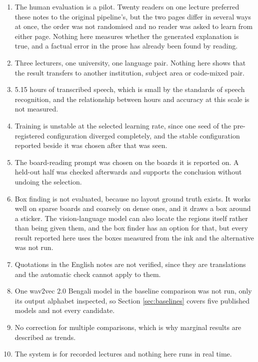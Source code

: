 \begin{enumerate}
  \item The human evaluation is a pilot. Twenty readers on one lecture preferred these
        notes to the original pipeline's, but the two pages differ in several ways at
        once, the order was not randomised and no reader was asked to learn from either
        page. Nothing here measures whether the generated explanation is true, and a
        factual error in the prose has already been found by reading.
  \item Three lecturers, one university, one language pair. Nothing here shows that the
        result transfers to another institution, subject area or code-mixed pair.
  \item 5.15 hours of transcribed speech, which is small by the standards of speech
        recognition, and the relationship between hours and accuracy at this scale is not
        measured.
  \item Training is unstable at the selected learning rate, since one seed of the
        pre-registered configuration diverged completely, and the stable configuration
        reported beside it was chosen after that was seen.
  \item The board-reading prompt was chosen on the boards it is reported on. A held-out
        half was checked afterwards and supports the conclusion without undoing the
        selection.
  \item Box finding is not evaluated, because no layout ground truth exists. It works well
        on sparse boards and coarsely on dense ones, and it draws a box around a sticker.
        The vision-language model can also locate the regions itself rather than being
        given them, and the box finder has an option for that, but every result reported
        here uses the boxes measured from the ink and the alternative was not run.
  \item Quotations in the English notes are not verified, since they are translations and
        the automatic check cannot apply to them.
  \item One wav2vec 2.0 Bengali model in the baseline comparison was not run, only its
        output alphabet inspected, so Section \ref{sec:baselines} covers five published
        models and not every candidate.
  \item No correction for multiple comparisons, which is why marginal results are described
        as trends.
  \item The system is for recorded lectures and nothing here runs in real time.
\end{enumerate}

